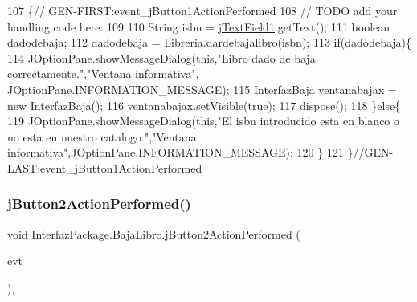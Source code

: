 \begin{DoxyCode}
107                                                                          \{\textcolor{comment}{//
      GEN-FIRST:event\_jButton1ActionPerformed}
108         \textcolor{comment}{// TODO add your handling code here:}
109         
110         String isbn = \mbox{\hyperlink{class_interfaz_package_1_1_baja_libro_a2b033ca044fbf57e3ee123d55b137e31}{jTextField1}}.getText();
111         \textcolor{keywordtype}{boolean} dadodebaja;
112         dadodebaja = Libreria.dardebajalibro(isbn);
113         \textcolor{keywordflow}{if}(dadodebaja)\{
114             JOptionPane.showMessageDialog(\textcolor{keyword}{this},\textcolor{stringliteral}{"Libro dado de baja correctamente."},\textcolor{stringliteral}{"Ventana informativa"},
      JOptionPane.INFORMATION\_MESSAGE);
115             InterfazBaja ventanabajax = \textcolor{keyword}{new} InterfazBaja();
116             ventanabajax.setVisible(\textcolor{keyword}{true});
117             dispose();
118         \}\textcolor{keywordflow}{else}\{
119             JOptionPane.showMessageDialog(\textcolor{keyword}{this},\textcolor{stringliteral}{"El isbn introducido esta en blanco o no esta en nuestro
       catalogo."},\textcolor{stringliteral}{"Ventana informativa"},JOptionPane.INFORMATION\_MESSAGE);
120         \}
121     \}\textcolor{comment}{//GEN-LAST:event\_jButton1ActionPerformed}
\end{DoxyCode}
\mbox{\label{class_interfaz_package_1_1_baja_libro_a52b4bc390d2eed69360ad1c46161f230}} 
\subsubsection{\texorpdfstring{j\+Button2\+Action\+Performed()}{jButton2ActionPerformed()}}
{\footnotesize\ttfamily void Interfaz\+Package.\+Baja\+Libro.\+j\+Button2\+Action\+Performed (\begin{DoxyParamCaption}\item[{java.\+awt.\+event.\+Action\+Event}]{evt }\end{DoxyParamCaption})\hspace{0.3cm}{\ttfamily [inline]}, {\ttfamily [private]}}


